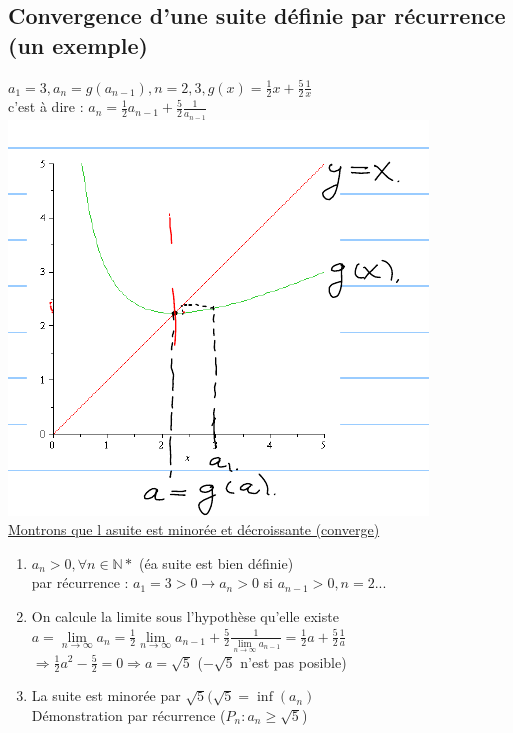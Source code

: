 \documentclass[12pt,a4paper]{article}
\newcommand{\limite}{\lim\limits_}
\newcommand{\ninf}{\ensuremath{n \to \infty}}
\begin{document}
{\subsection{Convergence d'une suite définie par récurrence (un exemple)}
$a_1 = 3, a_n = g(a_{n-1}), n = 2,3, g(x) = \frac{1}{2}x + \frac{5}{2}\frac{1}{x}$\\
c'est à dire : $a_n = \frac{1}{2} a_{n-1} + \frac{5}{2}\frac{1}{a_{n-1}}$\\
\includegraphics[scale=0.5]{illustrations_Analyse/suite_recurrence}\\
\underline{Montrons que l asuite est minorée et décroissante (converge)}
\begin{enumerate}
\item $a_n > 0, \forall n \in \mathbb{N*}$ (éa suite est bien définie)\\
par récurrence : $a_1 = 3  > 0 \to a_n > 0$ si $a_{n-1} > 0, n=2...$
\item On calcule la limite sous l'hypothèse qu'elle existe\\
$a = \limite{\ninf} a_n = \frac{1}{2} \limite{\ninf} a_{n-1} + \frac{5}{2} \frac{1}{\limite{\ninf} a_{n-1}} = \frac{1}{2} a  + \frac{5}{2}\frac{1}{a}$\\
$\Rightarrow \frac{1}{2}a^2 - \frac{5}{2} = 0 \Rightarrow a = \sqrt{5}$ ($-\sqrt{5}$ n'est pas posible)
\item La suite est minorée par $\sqrt{5} (\sqrt{5} = \inf(a_n)$\\
Démonstration par récurrence ($P_n : a_n \geq \sqrt{5}$)
\begin{itemize}

\end{itemize}
\end{enumerate}}
\end{document}
